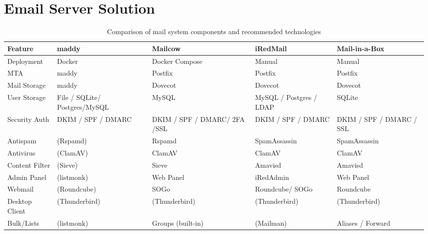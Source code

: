 \section{Email Server Solution}

\begin{table}[h!]
\centering
\renewcommand{\arraystretch}{1.2}
\begin{tabular}{|p{2.6cm}|p{3.2cm}|p{3.2cm}|p{3.2cm}|p{3.2cm}|}
\hline
\textbf{Feature} & \textbf{maddy} & \textbf{Mailcow} & \textbf{iRedMail} & \textbf{Mail-in-a-Box} \\
\hline
Deployment & Docker & Docker Compose & Manual & Manual \\
\hline
MTA & maddy & Postfix & Postfix & Postfix \\
\hline
Mail Storage & maddy & Dovecot & Dovecot & Dovecot \\
\hline
User Storage & File / SQLite/ Postgres/MySQL & MySQL & MySQL / Postgres / LDAP & SQLite \\
\hline
Security Auth & DKIM / SPF / DMARC & DKIM / SPF / DMARC/ 2FA /SSL & DKIM / SPF / DMARC & DKIM / SPF / DMARC / SSL \\
\hline
Antispam & (Rspamd) & Rspamd & SpamAssassin & SpamAssassin \\
\hline
Antivirus & (ClamAV) & ClamAV & ClamAV & ClamAV \\
\hline
Content Filter & (Sieve) & Sieve & Amavisd & Amavisd \\
\hline
Admin Panel & (listmonk) & Web Panel & iRedAdmin & Web Panel \\
\hline
Webmail & (Roundcube) & SOGo & Roundcube/ SOGo & Roundcube \\
\hline
Desktop Client & (Thunderbird) & (Thunderbird) & (Thunderbird) & (Thunderbird) \\
\hline
Bulk/Lists & (listmonk) & Groups (built-in) & (Mailman) & Aliases / Forward \\
\hline
\end{tabular}
\caption{Comparison of mail system components and recommended technologies}
\end{table}

